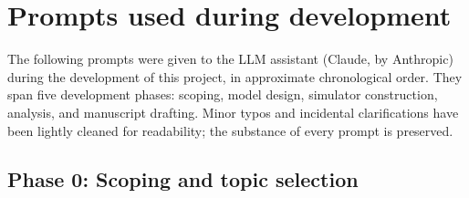 \documentclass[11pt,a4paper]{article}
\begin{document}
\appendix
\section{Prompts used during development}\label{app:prompts}
The following prompts were given to the LLM assistant (Claude, by Anthropic) during the development of this project, in approximate chronological order. They span five development phases: scoping, model design, simulator construction, analysis, and manuscript drafting. Minor typos and incidental clarifications have been lightly cleaned for readability; the substance of every prompt is preserved.

\subsection*{Phase 0: Scoping and topic selection}
\end{document}
